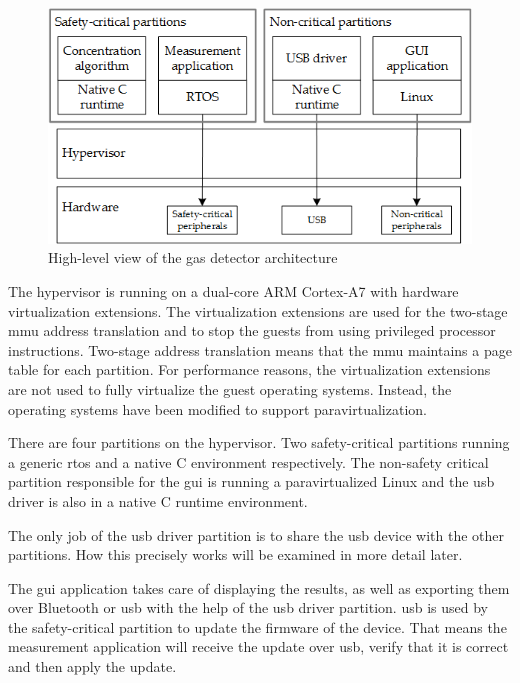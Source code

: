 \begin{figure}[ht!]
\centering
\includegraphics[scale=0.9]{Figures/gas_detect_high_level_no_ipc_with_criticality.png}
\decoRule
\caption{High-level view of the gas detector architecture}
\label{fig:gas_detect_high_level}
\end{figure}

\newcommand{\bToa}{3}
\newcommand{\bToc}{1}
\newcommand{\cTob}{2}
\newcommand{\usbToa}{4}
\newcommand{\aTousb}{4}
\newcommand{\usbTob}{5}
\newcommand{\bTousb}{5}

The hypervisor is running on a dual-core ARM Cortex-A7 with hardware virtualization extensions. The virtualization extensions are used for the two-stage \acrshort{mmu} address translation and to stop the guests from using privileged processor instructions. Two-stage address translation means that the \acrshort{mmu} maintains a page table for each partition. 
For performance reasons, the virtualization extensions are not used to fully virtualize the guest operating systems. Instead, the operating systems have been modified to support paravirtualization.

There are four partitions on the hypervisor. Two safety-critical partitions running a generic \acrshort{rtos} and a native C environment respectively. The non-safety critical partition responsible for the \acrshort{gui} is running a paravirtualized Linux and the \acrshort{usb} driver is also in a native C runtime environment. 

The only job of the \acrshort{usb} driver partition is to share the \acrshort{usb} device with the other partitions. How this precisely works will be examined in more detail later.

The \acrshort{gui} application takes care of displaying the results, as well as exporting them over Bluetooth or \acrshort{usb} with the help of the \acrshort{usb} driver partition. \acrshort{usb} is used by the safety-critical partition to update the firmware of the device. That means the measurement application will receive the update over \acrshort{usb}, verify that it is correct and then apply the update.

